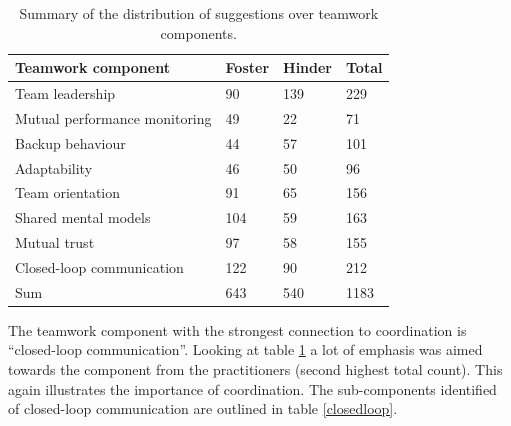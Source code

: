 \begin{table}
\begin{center}
    \begin{tabular}{ | p{6cm} | p{2.5cm} | p{2.5cm} | p{2.5cm} |}
    \hline
    \textbf{Teamwork component} & \textbf{Foster} & \textbf{Hinder} & \textbf{Total} \\ \hline
    Team leadership & 90 & 139 & 229 \\ \hline
    Mutual performance monitoring & 49 & 22 & 71 \\ \hline
    Backup behaviour & 44 & 57 & 101 \\ \hline
    Adaptability & 46 & 50 & 96 \\ \hline
    Team orientation & 91 & 65 & 156 \\ \hline
    Shared mental models & 104 & 59 & 163 \\ \hline
    Mutual trust & 97 & 58 & 155 \\ \hline
    Closed-loop communication & 122 & 90 & 212 \\ \hline
    Sum & 643 & 540 & 1183 \\ \hline
    \end{tabular}
    \caption{Summary of the distribution of suggestions over teamwork components.}
    \label{summary2}
\end{center}
\end{table}

The teamwork component with the strongest connection to coordination is ``closed-loop communication''. Looking at table \ref{summary2} a lot of emphasis was aimed towards the component from the practitioners (second highest total count). This again illustrates the importance of coordination. The sub-components identified of closed-loop communication are outlined in table \ref{closedloop}.

